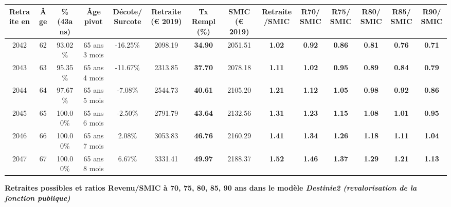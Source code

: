 \begin{adjustbox}{max width=\textwidth} 
\begin{tabular}[htb]{|c|c||c|c|c||c|c||c|c||c|c|c|c|c|} 
\hline 
 Retraite en &  Âge &  \%(43ans) &  Âge pivot &  Décote/Surcote &  Retraite (\euro{} 2019) &  Tx Rempl(\%) &  SMIC (\euro{} 2019) &  Retraite/SMIC &  R70/SMIC &  R75/SMIC &  R80/SMIC &  R85/SMIC &  R90/SMIC \\ 
\hline \hline 
 2042 &  62 &  93.02\% &  65 ans 3 mois &  -16.25\% &  2098.19 &  {\bf 34.90} &  2051.51 &  {\bf 1.02} &  {\bf {\color{red} 0.92}} &  {\bf {\color{red} 0.86}} &  {\bf {\color{red} 0.81}} &  {\bf {\color{red} 0.76}} &  {\bf {\color{red} 0.71}} \\ 
\hline 
 2043 &  63 &  95.35\% &  65 ans 4 mois &  -11.67\% &  2313.85 &  {\bf 37.70} &  2078.18 &  {\bf 1.11} &  {\bf 1.02} &  {\bf {\color{red} 0.95}} &  {\bf {\color{red} 0.89}} &  {\bf {\color{red} 0.84}} &  {\bf {\color{red} 0.79}} \\ 
\hline 
 2044 &  64 &  97.67\% &  65 ans 5 mois &  -7.08\% &  2544.73 &  {\bf 40.61} &  2105.20 &  {\bf 1.21} &  {\bf 1.12} &  {\bf 1.05} &  {\bf {\color{red} 0.98}} &  {\bf {\color{red} 0.92}} &  {\bf {\color{red} 0.86}} \\ 
\hline 
 2045 &  65 &  100.00\% &  65 ans 6 mois &  -2.50\% &  2791.79 &  {\bf 43.64} &  2132.56 &  {\bf 1.31} &  {\bf 1.23} &  {\bf 1.15} &  {\bf 1.08} &  {\bf 1.01} &  {\bf {\color{red} 0.95}} \\ 
\hline 
 2046 &  66 &  100.00\% &  65 ans 7 mois &  2.08\% &  3053.83 &  {\bf 46.76} &  2160.29 &  {\bf 1.41} &  {\bf 1.34} &  {\bf 1.26} &  {\bf 1.18} &  {\bf 1.11} &  {\bf 1.04} \\ 
\hline 
 2047 &  67 &  100.00\% &  65 ans 8 mois &  6.67\% &  3331.41 &  {\bf 49.97} &  2188.37 &  {\bf 1.52} &  {\bf 1.46} &  {\bf 1.37} &  {\bf 1.29} &  {\bf 1.21} &  {\bf 1.13} \\ 
\hline 
\hline 
\end{tabular} 
\end{adjustbox} 
 
 \vspace{0.1cm} 
{\bf \noindent Retraites possibles et ratios Revenu/SMIC à 70, 75, 80, 85, 90 ans dans le modèle \emph{Destinie2 (revalorisation de la fonction publique)}}  
 
